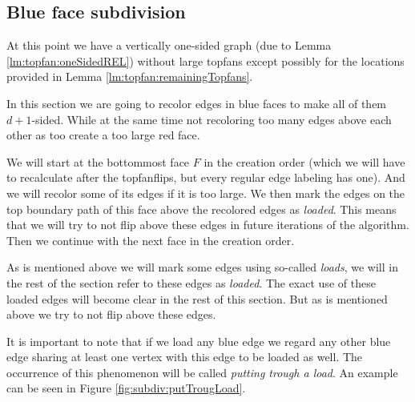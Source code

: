 
\subsection{Blue face subdivision}
\thispagestyle{plain}
\label{ss:subdiv}
At this point we have a vertically one-sided graph (due to Lemma \ref{lm:topfan:oneSidedREL}) without large topfans except possibly for the locations provided in Lemma \ref{lm:topfan:remainingTopfans}.

In this section we are going to recolor edges in blue faces to make all of them $d+1$-sided. While at the same time not recoloring too many edges above each other as too create a too large red face.

We will start at the bottommost face $F$ in the creation order (which we will have to recalculate after the topfanflips, but every regular edge labeling has one). And we will recolor some of its edges if it is too large. 
We then mark the edges on the top boundary path of this face above the recolored edges as \emph{loaded}. This means that we will try to not flip above these edges in future iterations of the algorithm.
Then we continue with the next face in the creation order.

As is mentioned above we will mark some edges using so-called \emph{loads}, we will in the rest of the section refer to these edges as \emph{loaded}. The exact use of these loaded edges will become clear in the rest of this section. But as is mentioned above we try to not flip above these edges.

It is important to note that if we load any blue edge we regard any other blue edge sharing at least one vertex with this edge to be loaded as well. The occurrence of this phenomenon will be called \emph{putting trough a load}. An example can be seen in Figure \ref{fig:subdiv:putTrougLoad}.

